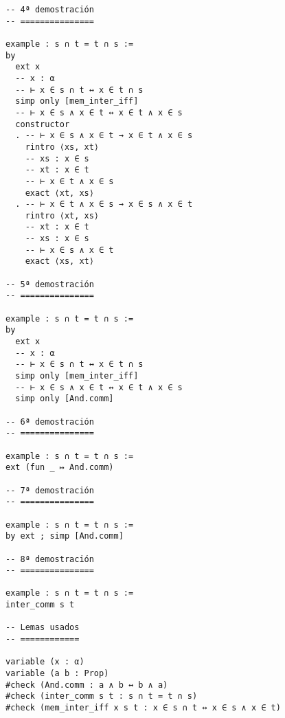 \begin{verbatim}
-- 4ª demostración
-- ===============

example : s ∩ t = t ∩ s :=
by
  ext x
  -- x : α
  -- ⊢ x ∈ s ∩ t ↔ x ∈ t ∩ s
  simp only [mem_inter_iff]
  -- ⊢ x ∈ s ∧ x ∈ t ↔ x ∈ t ∧ x ∈ s
  constructor
  . -- ⊢ x ∈ s ∧ x ∈ t → x ∈ t ∧ x ∈ s
    rintro ⟨xs, xt⟩
    -- xs : x ∈ s
    -- xt : x ∈ t
    -- ⊢ x ∈ t ∧ x ∈ s
    exact ⟨xt, xs⟩
  . -- ⊢ x ∈ t ∧ x ∈ s → x ∈ s ∧ x ∈ t
    rintro ⟨xt, xs⟩
    -- xt : x ∈ t
    -- xs : x ∈ s
    -- ⊢ x ∈ s ∧ x ∈ t
    exact ⟨xs, xt⟩

-- 5ª demostración
-- ===============

example : s ∩ t = t ∩ s :=
by
  ext x
  -- x : α
  -- ⊢ x ∈ s ∩ t ↔ x ∈ t ∩ s
  simp only [mem_inter_iff]
  -- ⊢ x ∈ s ∧ x ∈ t ↔ x ∈ t ∧ x ∈ s
  simp only [And.comm]

-- 6ª demostración
-- ===============

example : s ∩ t = t ∩ s :=
ext (fun _ ↦ And.comm)

-- 7ª demostración
-- ===============

example : s ∩ t = t ∩ s :=
by ext ; simp [And.comm]

-- 8ª demostración
-- ===============

example : s ∩ t = t ∩ s :=
inter_comm s t

-- Lemas usados
-- ============

variable (x : α)
variable (a b : Prop)
#check (And.comm : a ∧ b ↔ b ∧ a)
#check (inter_comm s t : s ∩ t = t ∩ s)
#check (mem_inter_iff x s t : x ∈ s ∩ t ↔ x ∈ s ∧ x ∈ t)
\end{verbatim}

